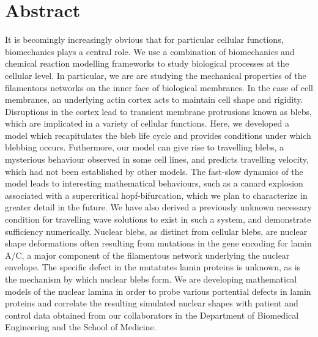 \chapter{Abstract}

It is becomingly increasingly obvious that for particular cellular functions, biomechanics plays a central role. We use a combination of biomechanics and chemical reaction modelling frameworks to study biological processes at the cellular level. In particular, we are are studying the mechanical properties of the filamentous networks on the inner face of biological membranes. In the case of cell membranes, an underlying actin cortex acts to maintain cell shape and rigidity. Disruptions in the cortex lead to transient membrane protrusions known as blebs, which are implicated in a variety of cellular functions. Here, we developed a model which recapitulates the bleb life cycle and provides conditions under which blebbing occurs. Futhermore, our model can give rise to travelling blebs, a mysterious behaviour observed in some cell lines, and predicts travelling velocity, which had not been established by other models. The fast-slow dynamics of the model leads to interesting mathematical behaviours, such as a canard explosion associated with a supercritical hopf-bifurcation, which we plan to characterize in greater detail in the future. We have also derived a previously unknown necessary condition for travelling wave solutions to exist in such a system, and demonstrate sufficiency numerically. Nuclear blebs, as distinct from cellular blebs, are nuclear shape deformations often resulting from mutations in the gene encoding for lamin A/C, a major component of the filamentous network underlying the nuclear envelope. The specific defect in the mutatutes lamin proteins is unknown, as is the mechanism by which nuclear blebs form. We are developing mathematical models of the nuclear lamina in order to probe various portential defects in lamin proteins and correlate the resulting simulated nuclear shapes with patient and control data obtained from our collaborators in the Department of Biomedical Engineering  and the School of Medicine. 

